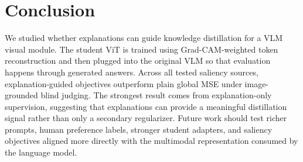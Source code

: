 \documentclass{article}
\begin{document}
\section{Conclusion}
\label{sec:conclusion}

We studied whether explanations can guide knowledge distillation for a VLM visual module.
The student ViT is trained using Grad-CAM-weighted token reconstruction and then plugged into the original VLM so that evaluation happens through generated answers.
Across all tested saliency sources, explanation-guided objectives outperform plain global MSE under image-grounded blind judging.
The strongest result comes from explanation-only supervision, suggesting that explanations can provide a meaningful distillation signal rather than only a secondary regularizer.
Future work should test richer prompts, human preference labels, stronger student adapters, and saliency objectives aligned more directly with the multimodal representation consumed by the language model.










\end{document}
